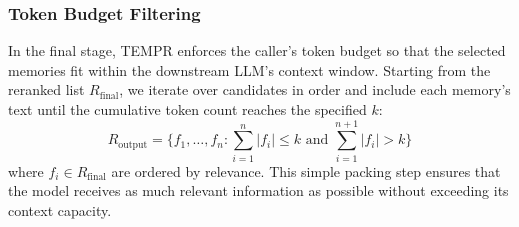 \subsubsection{Token Budget Filtering}

In the final stage, TEMPR enforces the caller's token budget so that the selected memories fit within the downstream LLM's context window. Starting from the reranked list $R_{\text{final}}$, we iterate over candidates in order and include each memory's text until the cumulative token count reaches the specified $k$:
\begin{equation}
R_{\text{output}} = \{f_1, \ldots, f_n : \sum_{i=1}^n |f_i| \leq k \text{ and } \sum_{i=1}^{n+1} |f_i| > k\}
\end{equation}
where $f_i \in R_{\text{final}}$ are ordered by relevance. This simple packing step ensures that the model receives as much relevant information as possible without exceeding its context capacity.
